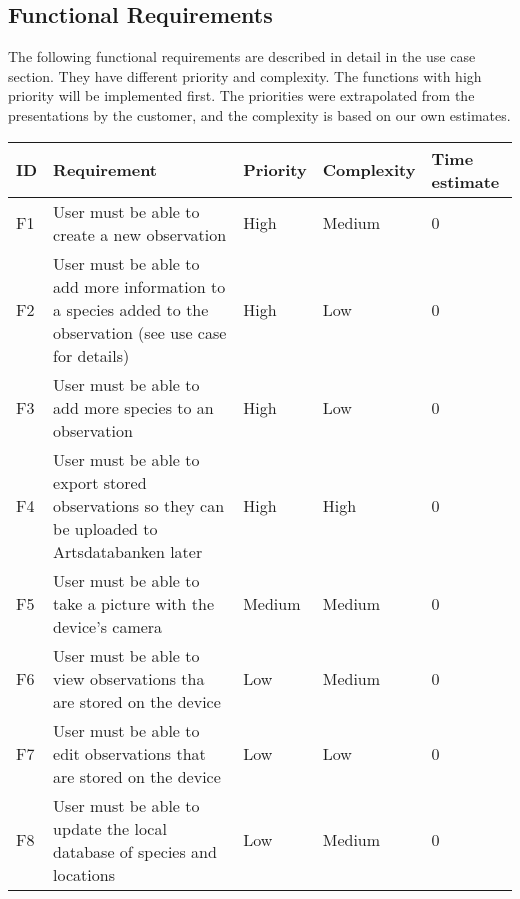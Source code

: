 \subsection{Functional Requirements}
The following functional requirements are described in detail in the use case section. They have different priority and complexity. The functions with high priority will be implemented first. The priorities were extrapolated from the presentations by the customer, and the complexity is based on our own estimates.

\begin{tabular}[t]{|l|p{}|l|l|p{}|}\hline
\bf ID&\bf Requirement& \bf Priority& \bf Complexity&\bf Time estimate\\\hline
F1&User must be able to create a new observation &High&Medium&0\\\hline
F2&User must be able to add more information to a species added to the observation (see use case for details) &High&Low&0\\\hline
F3&User must be able to add more species to an observation &High&Low&0\\\hline
F4&User must be able to export stored observations so they can be uploaded to Artsdatabanken later &High&High&0\\\hline
F5&User must be able to take a picture with the device's camera &Medium&Medium&0\\\hline
F6&User must be able to view observations tha are stored on the device &Low&Medium&0\\\hline
F7&User must be able to edit observations that are stored on the device &Low&Low&0\\\hline
F8&User must be able to update the local database of species and locations &Low&Medium&0\\\hline
\end{tabular}